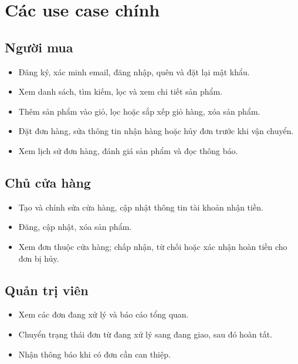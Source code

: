\documentclass[12pt]{article}
\begin{document}
\section{Các use case chính}
\subsection{Người mua}
\begin{itemize}
  \item Đăng ký, xác minh email, đăng nhập, quên và đặt lại mật khẩu.
  \item Xem danh sách, tìm kiếm, lọc và xem chi tiết sản phẩm.
  \item Thêm sản phẩm vào giỏ, lọc hoặc sắp xếp giỏ hàng, xóa sản phẩm.
  \item Đặt đơn hàng, sửa thông tin nhận hàng hoặc hủy đơn trước khi vận chuyển.
  \item Xem lịch sử đơn hàng, đánh giá sản phẩm và đọc thông báo.
\end{itemize}

\subsection{Chủ cửa hàng}
\begin{itemize}
  \item Tạo và chỉnh sửa cửa hàng, cập nhật thông tin tài khoản nhận tiền.
  \item Đăng, cập nhật, xóa sản phẩm.
  \item Xem đơn thuộc cửa hàng; chấp nhận, từ chối hoặc xác nhận hoàn tiền cho đơn bị hủy.
\end{itemize}

\subsection{Quản trị viên}
\begin{itemize}
  \item Xem các đơn đang xử lý và báo cáo tổng quan.
  \item Chuyển trạng thái đơn từ đang xử lý sang đang giao, sau đó hoàn tất.
  \item Nhận thông báo khi có đơn cần can thiệp.
\end{itemize}
\end{document}
